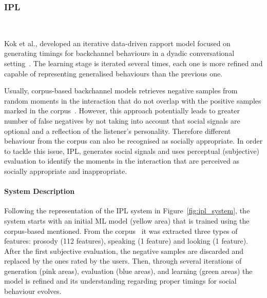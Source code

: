 \subsubsection{\acl{IPL}} \hspace*{\fill} \\
\label{subsec:IterativePerceptualLearning}

Kok et al., developed an iterative data-driven rapport model focused on generating timings for backchannel behaviours in a dyadic conversational setting~\cite{Kok2012}. The learning stage is iterated several times, each one is more refined and capable of representing generalised behaviours than the previous one. 

Usually, corpus-based backchannel models retrieves negative samples from random moments in the interaction that do not overlap with the positive samples marked in the corpus~\cite{Kok2012}. However, this approach potentially leads to greater number of false negatives by not taking into account that social signals are optional and a reflection of the listener's personality. Therefore different behaviour from the corpus can also be recognised as socially appropriate. In order to tackle this issue, \ac{IPL}, generates social signals and uses perceptual (subjective) evaluation to identify the moments in the interaction that are perceived as socially appropriate and inappropriate.


\paragraph{\textbf{System Description}}

Following the representation of the \ac{IPL} system in Figure~\ref{fig:ipl_system}, the system starts with an initial \ac{ML} model (yellow area) that is trained using the corpus-based mentioned. From the corpus~\cite{DeKok2011} it was extracted three types of features: prosody (112 features), speaking (1 feature) and looking (1 feature). After the first subjective evaluation, the negative samples are discarded and replaced by the ones rated by the users. Then, through several iterations of generation  (pink areas), evaluation (blue areas), and learning (green areas) the model is refined and its understanding regarding proper timings for social behaviour evolves.

